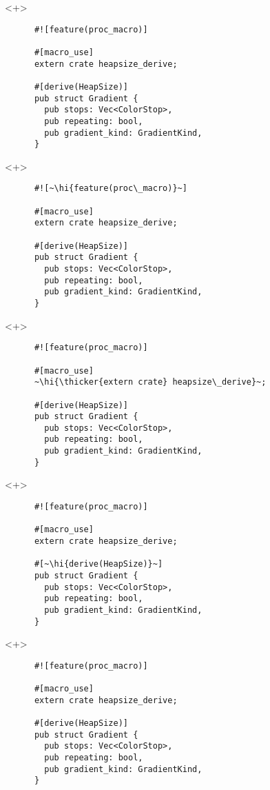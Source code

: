 \documentclass[usepdftitle=false]{beamer}
\renewcommand{\&}{\makebox[\widthof{\ampersand}][c]{\scalebox{0.9}[1.0]{\Book\ampersand}}}
\newcommand{\+}{\makebox[\widthof{+}][c]{\raisebox{-.2\height}{\scalefont{1.5}\Light+}}}
\newcommand{\thicker}[1]{\contourlength{0.26pt}\contour[10]{black}{#1}}
\newcommand{\hi}[1]{%
\tikz[baseline=(A.base)]
 \node[highlighting=0,inner sep=0pt,text depth=0pt] (A) {#1};%
}
\begin{document}
\begin{frame}[fragile]
  \begin{onlyenv}<+>
    \begin{verbatim}
      #![feature(proc_macro)]

      #[macro_use]
      extern crate heapsize_derive;

      #[derive(HeapSize)]
      pub struct Gradient {
        pub stops: Vec<ColorStop>,
        pub repeating: bool,
        pub gradient_kind: GradientKind,
      }
    \end{verbatim}
  \end{onlyenv}
  \begin{onlyenv}<+>
    \begin{verbatim}
      #![~\hi{feature(proc\_macro)}~]

      #[macro_use]
      extern crate heapsize_derive;

      #[derive(HeapSize)]
      pub struct Gradient {
        pub stops: Vec<ColorStop>,
        pub repeating: bool,
        pub gradient_kind: GradientKind,
      }
    \end{verbatim}
  \end{onlyenv}
  \begin{onlyenv}<+>
    \begin{verbatim}
      #![feature(proc_macro)]

      #[macro_use]
      ~\hi{\thicker{extern crate} heapsize\_derive}~;

      #[derive(HeapSize)]
      pub struct Gradient {
        pub stops: Vec<ColorStop>,
        pub repeating: bool,
        pub gradient_kind: GradientKind,
      }
    \end{verbatim}
  \end{onlyenv}
  \begin{onlyenv}<+>
    \begin{verbatim}
      #![feature(proc_macro)]

      #[macro_use]
      extern crate heapsize_derive;

      #[~\hi{derive(HeapSize)}~]
      pub struct Gradient {
        pub stops: Vec<ColorStop>,
        pub repeating: bool,
        pub gradient_kind: GradientKind,
      }
    \end{verbatim}
  \end{onlyenv}
  \begin{onlyenv}<+>
    \begin{verbatim}
      #![feature(proc_macro)]

      #[macro_use]
      extern crate heapsize_derive;

      #[derive(HeapSize)]
      pub struct Gradient {
        pub stops: Vec<ColorStop>,
        pub repeating: bool,
        pub gradient_kind: GradientKind,
      }
    \end{verbatim}
  \end{onlyenv}
\end{frame}
\end{document}
